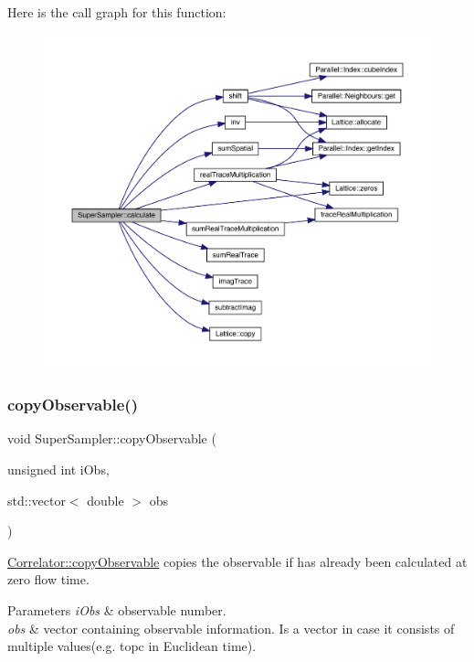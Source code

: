 Here is the call graph for this function\+:
\nopagebreak
\begin{figure}[H]
\begin{center}
\leavevmode
\includegraphics[width=350pt]{class_super_sampler_a7e1457583270077c4fbcb288ea9b954c_cgraph}
\end{center}
\end{figure}
\mbox{\label{class_super_sampler_a9f9155a519b2f60f029e92f641f54c9c}} 
\subsubsection{\texorpdfstring{copyObservable()}{copyObservable()}}
{\footnotesize\ttfamily void Super\+Sampler\+::copy\+Observable (\begin{DoxyParamCaption}\item[{unsigned int}]{i\+Obs,  }\item[{std\+::vector$<$ double $>$}]{obs }\end{DoxyParamCaption})\hspace{0.3cm}{\ttfamily [virtual]}}



\mbox{\hyperlink{class_correlator_ac780d8b180294ee4801ede6e6a13f7f4}{Correlator\+::copy\+Observable}} copies the observable if has already been calculated at zero flow time. 


\begin{DoxyParams}{Parameters}
{\em i\+Obs} & observable number. \\
\hline
{\em obs} & vector containing observable information. Is a vector in case it consists of multiple values(e.\+g. topc in Euclidean time). \\
\hline
\end{DoxyParams}


